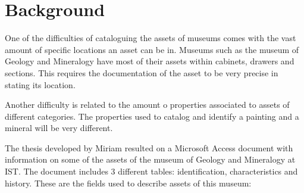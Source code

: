 
\section{Background}

One of the difficulties of cataloguing the assets of museums comes with the vast amount of specific locations an asset can be in. Museums such as the museum of Geology and Mineralogy have most of their assets within cabinets, drawers and sections. This requires the documentation of the asset to be very precise in stating its location.

Another difficulty is related to the amount o properties associated to assets of different categories. The properties used to catalog and identify a painting and a mineral will be very different.

The thesis \cite{Barros2007MaterialidadeIST} developed by Miriam resulted on a Microsoft Access document with information on some of the assets of the museum of Geology and Mineralogy at IST. The document includes 3 different tables: identification, characteristics and history. These are the fields used to describe assets of this museum:

